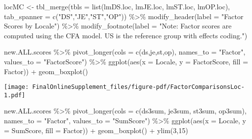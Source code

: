 \documentclass[
  letterpaper,
  DIV=11,
  numbers=noendperiod]{scrartcl}
\newenvironment{Shaded}{\begin{snugshade}}{\end{snugshade}}
\newcommand{\AttributeTok}[1]{\textcolor[rgb]{0.40,0.45,0.13}{#1}}
\newcommand{\DecValTok}[1]{\textcolor[rgb]{0.68,0.00,0.00}{#1}}
\newcommand{\FunctionTok}[1]{\textcolor[rgb]{0.28,0.35,0.67}{#1}}
\newcommand{\NormalTok}[1]{\textcolor[rgb]{0.00,0.23,0.31}{#1}}
\newcommand{\OtherTok}[1]{\textcolor[rgb]{0.00,0.23,0.31}{#1}}
\newcommand{\SpecialCharTok}[1]{\textcolor[rgb]{0.37,0.37,0.37}{#1}}
\newcommand{\StringTok}[1]{\textcolor[rgb]{0.13,0.47,0.30}{#1}}
\begin{document}
\begin{Shaded}
\begin{Highlighting}[]
\NormalTok{locMC }\OtherTok{\textless{}{-}} \FunctionTok{tbl\_merge}\NormalTok{(}\AttributeTok{tbls =} \FunctionTok{list}\NormalTok{(lmDS.loc, lmJE.loc, lmST.loc, lmOP.loc),}
          \AttributeTok{tab\_spanner =} \FunctionTok{c}\NormalTok{(}\StringTok{"DS"}\NormalTok{,}\StringTok{"JE"}\NormalTok{,}\StringTok{"ST"}\NormalTok{,}\StringTok{"OP"}\NormalTok{)) }\SpecialCharTok{\%\textgreater{}\%}
  \FunctionTok{modify\_header}\NormalTok{(}\AttributeTok{label =} \StringTok{"Factor Scores by Locale"}\NormalTok{) }\SpecialCharTok{\%\textgreater{}\%}
  \FunctionTok{modify\_footnote}\NormalTok{(}\AttributeTok{label =} \StringTok{"Note: Factor scores are computed using the CFA model.  US is the reference group with effects coding."}\NormalTok{)}


  
\NormalTok{new.ALL.scores }\SpecialCharTok{\%\textgreater{}\%}
  \FunctionTok{pivot\_longer}\NormalTok{(}\AttributeTok{cols =} \FunctionTok{c}\NormalTok{(ds,je,st,op), }
               \AttributeTok{names\_to =} \StringTok{"Factor"}\NormalTok{, }
               \AttributeTok{values\_to =} \StringTok{"FactorScore"}\NormalTok{) }\SpecialCharTok{\%\textgreater{}\%}
  \FunctionTok{ggplot}\NormalTok{(}\FunctionTok{aes}\NormalTok{(}\AttributeTok{x =}\NormalTok{ Locale, }
             \AttributeTok{y =}\NormalTok{ FactorScore, }
             \AttributeTok{fill =}\NormalTok{ Factor)) }\SpecialCharTok{+}
  \FunctionTok{geom\_boxplot}\NormalTok{()}
\end{Highlighting}
\end{Shaded}

\texttt{[image: FinalOnlineSupplement\_files/figure-pdf/FactorComparisonsLoc-1.pdf]}

\begin{Shaded}
\begin{Highlighting}[]
\NormalTok{new.ALL.scores }\SpecialCharTok{\%\textgreater{}\%}
  \FunctionTok{pivot\_longer}\NormalTok{(}\AttributeTok{cols =} \FunctionTok{c}\NormalTok{(ds3sum, je3sum, st3sum, op3sum), }
               \AttributeTok{names\_to =} \StringTok{"Factor"}\NormalTok{, }
               \AttributeTok{values\_to =} \StringTok{"SumScore"}\NormalTok{) }\SpecialCharTok{\%\textgreater{}\%}
  \FunctionTok{ggplot}\NormalTok{(}\FunctionTok{aes}\NormalTok{(}\AttributeTok{x =}\NormalTok{ Locale, }
             \AttributeTok{y =}\NormalTok{ SumScore, }
             \AttributeTok{fill =}\NormalTok{ Factor)) }\SpecialCharTok{+}
  \FunctionTok{geom\_boxplot}\NormalTok{() }\SpecialCharTok{+}
  \FunctionTok{ylim}\NormalTok{(}\DecValTok{3}\NormalTok{,}\DecValTok{15}\NormalTok{)}
\end{Highlighting}
\end{Shaded}
\end{document}

